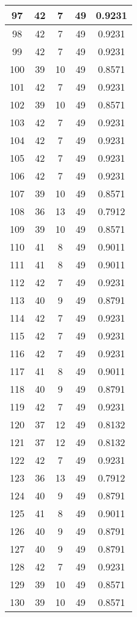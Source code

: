 \documentclass[letterpaper, 12pt]{article}
\begin{document}
\begin{longtable}{|c|c|c|c|c|}
\hline
97 & 42 & 7 & 49 & 0.9231 \\
\hline
98 & 42 & 7 & 49 & 0.9231 \\
\hline
99 & 42 & 7 & 49 & 0.9231 \\
\hline
100 & 39 & 10 & 49 & 0.8571 \\
\hline
101 & 42 & 7 & 49 & 0.9231 \\
\hline
102 & 39 & 10 & 49 & 0.8571 \\
\hline
103 & 42 & 7 & 49 & 0.9231 \\
\hline
104 & 42 & 7 & 49 & 0.9231 \\
\hline
105 & 42 & 7 & 49 & 0.9231 \\
\hline
106 & 42 & 7 & 49 & 0.9231 \\
\hline
107 & 39 & 10 & 49 & 0.8571 \\
\hline
108 & 36 & 13 & 49 & 0.7912 \\
\hline
109 & 39 & 10 & 49 & 0.8571 \\
\hline
110 & 41 & 8 & 49 & 0.9011 \\
\hline
111 & 41 & 8 & 49 & 0.9011 \\
\hline
112 & 42 & 7 & 49 & 0.9231 \\
\hline
113 & 40 & 9 & 49 & 0.8791 \\
\hline
114 & 42 & 7 & 49 & 0.9231 \\
\hline
115 & 42 & 7 & 49 & 0.9231 \\
\hline
116 & 42 & 7 & 49 & 0.9231 \\
\hline
117 & 41 & 8 & 49 & 0.9011 \\
\hline
118 & 40 & 9 & 49 & 0.8791 \\
\hline
119 & 42 & 7 & 49 & 0.9231 \\
\hline
120 & 37 & 12 & 49 & 0.8132 \\
\hline
121 & 37 & 12 & 49 & 0.8132 \\
\hline
122 & 42 & 7 & 49 & 0.9231 \\
\hline
123 & 36 & 13 & 49 & 0.7912 \\
\hline
124 & 40 & 9 & 49 & 0.8791 \\
\hline
125 & 41 & 8 & 49 & 0.9011 \\
\hline
126 & 40 & 9 & 49 & 0.8791 \\
\hline
127 & 40 & 9 & 49 & 0.8791 \\
\hline
128 & 42 & 7 & 49 & 0.9231 \\
\hline
129 & 39 & 10 & 49 & 0.8571 \\
\hline
130 & 39 & 10 & 49 & 0.8571 \\

\end{longtable}
\end{document}
